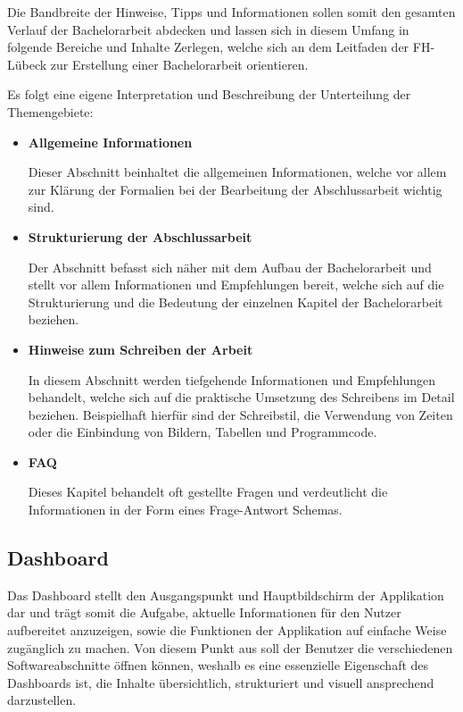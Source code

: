 \documentclass{scrreprt}
\begin{document}
\par Die Bandbreite der Hinweise, Tipps und Informationen sollen somit den gesamten Verlauf der Bachelorarbeit abdecken und lassen sich in diesem Umfang in folgende Bereiche und Inhalte Zerlegen, welche sich an dem Leitfaden der FH-Lübeck\cite{FHLuebeckBAAnleitung} zur Erstellung einer Bachelorarbeit orientieren.\\

\par Es folgt eine eigene Interpretation und Beschreibung der Unterteilung der Themengebiete:

\begin{itemize}
\item \textbf{Allgemeine Informationen}
\par Dieser Abschnitt beinhaltet die allgemeinen Informationen, welche vor allem zur Klärung der Formalien bei der Bearbeitung der Abschlussarbeit wichtig sind.

\item \textbf{Strukturierung der Abschlussarbeit}
\par Der Abschnitt befasst sich näher mit dem Aufbau der Bachelorarbeit und stellt vor allem Informationen und Empfehlungen bereit, welche sich auf die Strukturierung und die Bedeutung der einzelnen Kapitel der Bachelorarbeit beziehen. 

\item \textbf{Hinweise zum Schreiben der Arbeit}
\par In diesem Abschnitt werden tiefgehende Informationen und Empfehlungen behandelt, welche sich auf die praktische Umsetzung des Schreibens im Detail beziehen. Beispielhaft hierfür sind der Schreibstil, die Verwendung von Zeiten oder die Einbindung von Bildern, Tabellen und Programmcode.

\item \textbf{FAQ}
\par Dieses Kapitel behandelt oft gestellte Fragen und verdeutlicht die Informationen in der Form eines Frage-Antwort Schemas.
\end{itemize}

\subsection{Dashboard}
\par Das Dashboard stellt den Ausgangspunkt und Hauptbildschirm der Applikation dar und trägt somit die Aufgabe, aktuelle Informationen für den Nutzer aufbereitet anzuzeigen, sowie die Funktionen der Applikation auf einfache Weise zugänglich zu machen. Von diesem Punkt aus soll der Benutzer die verschiedenen Softwareabschnitte öffnen können, weshalb es eine essenzielle Eigenschaft des Dashboards ist, die Inhalte übersichtlich, strukturiert und visuell ansprechend darzustellen.\\
\end{document}
